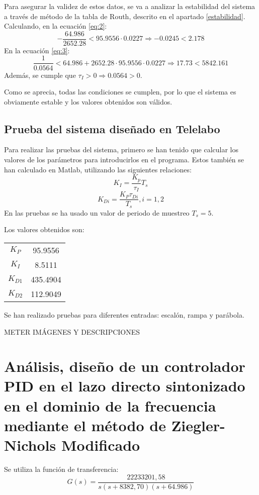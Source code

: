 \documentclass[a4paper]{article}
\begin{document}
Para asegurar la validez de estos datos, se va a analizar la estabilidad del sistema a través de método de la tabla de Routh, descrito en el apartado \ref{estabilidad}.
Calculando, en la ecuación \ref{eq:2}:	
\begin{equation}
	-\frac{64.986}{2652.28}< 95.9556\cdot0.0227 \Rightarrow 
	-0.0245<2.178
\end{equation}
En la ecuación \ref{eq:3}:
\begin{equation}
	\frac{1}{0.0564} < 64.986+2652.28\cdot95.9556\cdot0.0227 \Rightarrow
	17.73<5842.161
\end{equation}
Además, se cumple que $\tau_I > 0 \Rightarrow 0.0564>0$.

Como se aprecia, todas las condiciones se cumplen, por lo que el sistema es obviamente estable y los valores obtenidos son válidos.

\subsection{Prueba del sistema diseñado en Telelabo}
Para realizar las pruebas del sistema, primero se han tenido que calcular los valores de los parámetros para introducirlos en el programa. Estos también se han calculado en Matlab, utilizando las siguientes relaciones:
\begin{equation}
K_I=\frac{K_p}{\tau_I} T_s
\end{equation}
\begin{equation}
K_{Di}=\frac{K_P \tau_{Di}}{T_s}, i=1,2
\end{equation}
En las pruebas se ha usado un valor de periodo de muestreo $T_s=5$.

Los valores obtenidos son:
\begin{center}
	\begin{tabular}{c|c}
		$K_P$ & 95.9556 \\ 
		$K_I$ & 8.5111 \\ 
		$K_{D1}$ & 435.4904 \\ 
		$K_{D2}$ & 112.9049 \\
	\end{tabular} 
\end{center}

Se han realizado pruebas para diferentes entradas: escalón, rampa y parábola.

METER IMÁGENES Y DESCRIPCIONES

\section{Análisis, diseño de un controlador PID en el lazo directo sintonizado en el dominio de la frecuencia mediante el método de Ziegler-Nichols Modificado}
Se utiliza la función de transferencia:
\begin{equation}
G(s)=\frac{22233201,58}{s(s+8382,70)(s+64.986)}
\end{equation}
\end{document}
